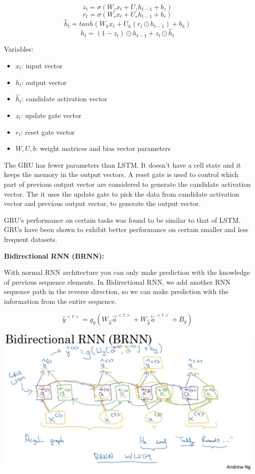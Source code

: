 \documentclass{article}
\begin{document}
\[z_{t} = \sigma(W_{z} x_{t} + U_{z} h_{t-1} + b_{z})\]
\[r_{t} = \sigma(W_{r} x_{t} + U_{r} h_{t-1} + b_{r})\]
\[\hat{h}_{t} = tanh(W_{h} x_{t} + U_{h} (r_{t} \odot h_{t-1}) + b_{h})\]
\[h_{t} = (1 - z_{t}) \odot h_{t-1} + z_{t} \odot \hat{h}_{t}\]

\noindent Variables:

\begin{itemize}
    \item \(x_{t}\): input vector
    \item \(h_{t}\): output vector
    \item \(\hat{h}_{t}\): candidate activation vector
    \item \(z_{t}\): update gate vector
    \item \(r_{t}\): reset gate vector
    \item \(W, U, b\): weight matrices and bias vector parameters
\end{itemize}

\noindent The GRU has fewer parameters than LSTM. It doesn't have a cell state and it keeps the memory in the output vectors. A reset gate is used to control which part of previous output vector are considered to generate the candidate activation vector. The it uses the update gate to pick the data from candidate activation vector and previous output vector, to generate the output vector.

\bigskip

\noindent GRU's performance on certain tasks was found to be similar to that of LSTM. GRUs have been shown to exhibit better performance on certain smaller and less frequent datasets.

\bigskip

\noindent \textbf{Bidirectional RNN (BRNN):}

\noindent With normal RNN architecture you can only make prediction with the knowledge of previous sequence elements. In Bidirectional RNN, we add another RNN sequence path in the reverse direction, so we can make prediction with the information from the entire sequence.

\[\hat{y}^{<t>} = g_{y}(W_{\overset{\rightarrow}{y}} \overset{\rightarrow}{a}^{<t>} + W_{\overset{\leftarrow}{y}} \overset{\leftarrow}{a}^{<t>} + B_{y})\]

\begin{center}
\includegraphics[scale=0.3]{./images/brnn.png}
\end{center}
\end{document}
